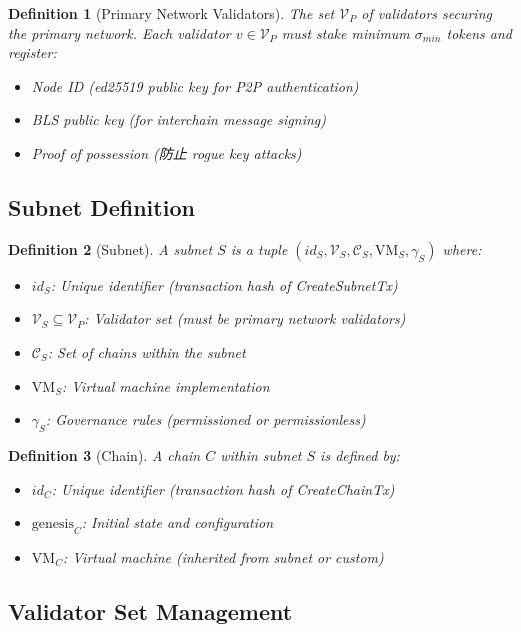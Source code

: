 \documentclass[11pt,a4paper]{article}
\newtheorem{definition}{Definition}
\begin{document}
\begin{definition}[Primary Network Validators]
The set $\mathcal{V}_P$ of validators securing the primary network. Each validator $v \in \mathcal{V}_P$ must stake minimum $\sigma_{min}$ tokens and register:
\begin{itemize}
    \item Node ID (ed25519 public key for P2P authentication)
    \item BLS public key (for interchain message signing)
    \item Proof of possession (防止 rogue key attacks)
\end{itemize}
\end{definition}

\subsection{Subnet Definition}

\begin{definition}[Subnet]
A subnet $S$ is a tuple $(id_S, \mathcal{V}_S, \mathcal{C}_S, \text{VM}_S, \gamma_S)$ where:
\begin{itemize}
    \item $id_S$: Unique identifier (transaction hash of CreateSubnetTx)
    \item $\mathcal{V}_S \subseteq \mathcal{V}_P$: Validator set (must be primary network validators)
    \item $\mathcal{C}_S$: Set of chains within the subnet
    \item $\text{VM}_S$: Virtual machine implementation
    \item $\gamma_S$: Governance rules (permissioned or permissionless)
\end{itemize}
\end{definition}

\begin{definition}[Chain]
A chain $C$ within subnet $S$ is defined by:
\begin{itemize}
    \item $id_C$: Unique identifier (transaction hash of CreateChainTx)
    \item $\text{genesis}_C$: Initial state and configuration
    \item $\text{VM}_C$: Virtual machine (inherited from subnet or custom)
\end{itemize}
\end{definition}

\subsection{Validator Set Management}
\end{document}
